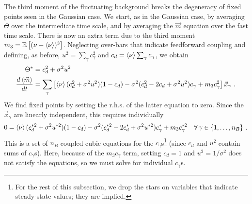 The third moment of the fluctuating background breaks the degeneracy of fixed points seen in the Gaussian case. We start, as in the Gaussian case, by averaging $\Theta$ over the intermediate time scale, and by averaging the $\vec{m}$ equation over the fast time scale. There is now an extra term due to the third moment $m_3 = \mathbb{E}\left[ (\nu - \braket{\nu})^3 \right]$. Neglecting over-bars that indicate feedforward coupling and defining, as before, $u^2 = \sum_{\gamma} c_{\gamma}^2$ and $c_d = \braket{\nu} \sum_{\gamma} c_{\gamma}$, 
we obtain
\begin{align*}
	\Theta^* &= c_d^2 + \sigma^2 u^2 \nonumber \\
	\frac{d \braket{\vec{m}}}{dt} &= \sum_{\gamma} \left[ \braket{\nu}(c_d^2 +\sigma^2 u^2)(1 - c_d) - \sigma^2 (c_d^2 - 2c_d + \sigma^2 u^2) c_{\gamma} + m_3 c_{\gamma}^2  \right] \vec{x}_{\gamma} \,\, . 
	\label{eq:mean_dynamics_m3}
\end{align*}
We find fixed points by setting the r.h.s. of the latter equation to zero. Since the $\vec{x}_{\gamma}$ are linearly independent, this requires individually
\begin{equation}
	0 = \braket{\nu}(c_d^{*2} +\sigma^2 u^{*2})(1 - c_d) - \sigma^2 (c_d^{*2} - 2c_d^* + \sigma^2 u^{*2})c_{\gamma}^* +  m_3 c_{\gamma}^{*2}   \quad \forall \,\gamma \in \{1, \ldots, n_B\} \,\, .
	\label{eq:fixed_pts_m3}
\end{equation}
This is a set of $n_B$ coupled cubic equations for the $c_{\gamma}$s{\protect\footnote{
For the rest of this subsection, we drop the stars on variables that indicate steady-state values; they are implied. 
}} (since $c_d$ and $u^2$ contain sums of $c_{\gamma}$s). Here, because of the $m_3 c_{\gamma}$ term, setting $c_d = 1$ and $u^2 = 1/\sigma^2$ does not satisfy the equations, so we must solve for individual $c_{\gamma}$s. 

